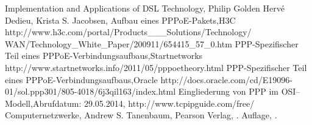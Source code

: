 \documentclass[journal,11pt]{IEEEtran}
\begin{document}
\begin{thebibliography}{1}
 Implementation and Applications of DSL Technology, \newblock Philip Golden Hervé Dedieu, \newblock Krista S. Jacobsen, 
 Aufbau eines PPPoE-Pakets,\newblock H3C \newblock http://www.h3c.com/portal/Products\_\_\_Solutions/Technology/\\WAN/Technology\_White\_Paper/200911/654415\_57\_0.htm
 PPP-Spezifischer Teil eines PPPoE-Verbindungsaufbaus,\newblock Startnetworks \newblock http://www.startnetworks.info/2011/05/pppoe\-theory.html
 PPP-Spezifischer Teil eines PPPoE-Verbindungsaufbaus,\newblock Oracle \newblock http://docs.oracle.com/cd/E19096-01/sol.ppp301/805-4018/6j3qil163/index.html
 Eingliederung von PPP im OSI--Modell,\newblock Abrufdatum: 29.05.2014, \newblock http://www.tcpipguide.com/free/
 Computernetzwerke, \newblock Andrew S. Tanenbaum,  \newblock Pearson Verlag, . Auflage, .
\end{thebibliography} 
\end{document}

